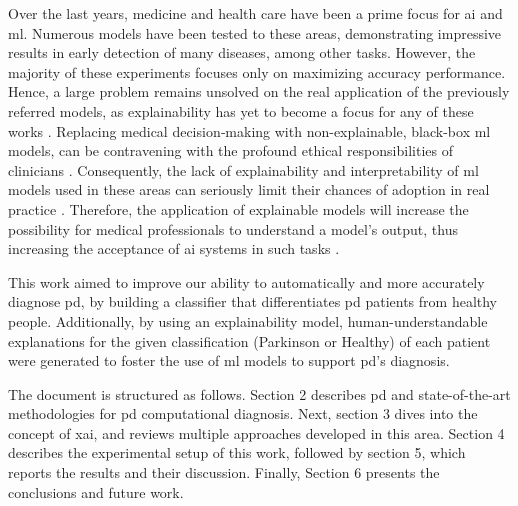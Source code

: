Over the last years, medicine and health care have been a prime focus for \gls{ai} and \gls{ml}. Numerous models have been tested to these areas, demonstrating impressive results in early detection of many diseases, among other tasks. However, the majority of these experiments focuses only on maximizing accuracy performance. Hence, a large problem remains unsolved on the real application of the previously referred models, as explainability has yet to become a focus for any of these works \cite{LIME_explainability}.
Replacing medical decision‐making with non-explainable, black-box \gls{ml} models, can be contravening with the profound ethical responsibilities of clinicians \cite{black_box_model_problem}. Consequently, the lack of explainability and interpretability of \gls{ml} models used in these areas can seriously limit their chances of adoption in real practice \cite{interpretability_importance}. Therefore, the application of explainable models will increase the possibility for medical professionals to understand a model's output, thus increasing the acceptance of \gls{ai} systems in such tasks \cite{explainable_ai_systems}.

This work aimed to improve our ability to automatically and more accurately diagnose \gls{pd}, by building a classifier that differentiates \gls{pd} patients from healthy people. Additionally, by using an explainability model, human-understandable explanations for the given classification (Parkinson or Healthy) of each patient were generated to foster the use of \gls{ml} models to support \gls{pd}'s diagnosis.

The document is structured as follows. Section 2 describes \gls{pd} and state-of-the-art methodologies for \gls{pd} computational diagnosis. Next, section 3 dives into the concept of \gls{xai}, and reviews multiple approaches developed in this area. Section 4 describes the experimental setup of this work, followed by section 5, which reports the results and their discussion. Finally, Section 6 presents the conclusions and future work.


